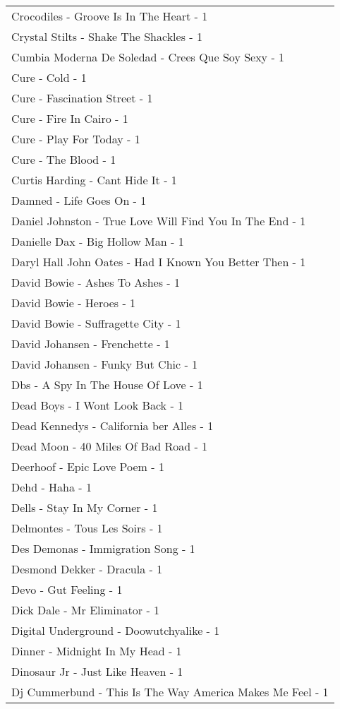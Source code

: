 \documentclass[
]{article}
\begin{document}
\begin{longtable}{l}
Crocodiles - Groove Is In The Heart - 1 \\ 
Crystal Stilts - Shake The Shackles - 1 \\ 
Cumbia Moderna De Soledad - Crees Que Soy Sexy - 1 \\ 
Cure - Cold - 1 \\ 
Cure - Fascination Street - 1 \\ 
Cure - Fire In Cairo - 1 \\ 
Cure - Play For Today - 1 \\ 
Cure - The Blood - 1 \\ 
Curtis Harding - Cant Hide It - 1 \\ 
Damned - Life Goes On - 1 \\ 
Daniel Johnston - True Love Will Find You In The End - 1 \\ 
Danielle Dax - Big Hollow Man - 1 \\ 
Daryl Hall John Oates - Had I Known You Better Then - 1 \\ 
David Bowie - Ashes To Ashes - 1 \\ 
David Bowie - Heroes - 1 \\ 
David Bowie - Suffragette City - 1 \\ 
David Johansen - Frenchette - 1 \\ 
David Johansen - Funky But Chic - 1 \\ 
Dbs - A Spy In The House Of Love - 1 \\ 
Dead Boys - I Wont Look Back - 1 \\ 
Dead Kennedys - California ber Alles - 1 \\ 
Dead Moon - 40 Miles Of Bad Road - 1 \\ 
Deerhoof - Epic Love Poem - 1 \\ 
Dehd - Haha - 1 \\ 
Dells - Stay In My Corner - 1 \\ 
Delmontes - Tous Les Soirs - 1 \\ 
Des Demonas - Immigration Song - 1 \\ 
Desmond Dekker - Dracula - 1 \\ 
Devo - Gut Feeling - 1 \\ 
Dick Dale - Mr Eliminator - 1 \\ 
Digital Underground - Doowutchyalike - 1 \\ 
Dinner - Midnight In My Head - 1 \\ 
Dinosaur Jr - Just Like Heaven - 1 \\ 
Dj Cummerbund - This Is The Way America Makes Me Feel - 1 \\ 

\end{longtable}
\end{document}
